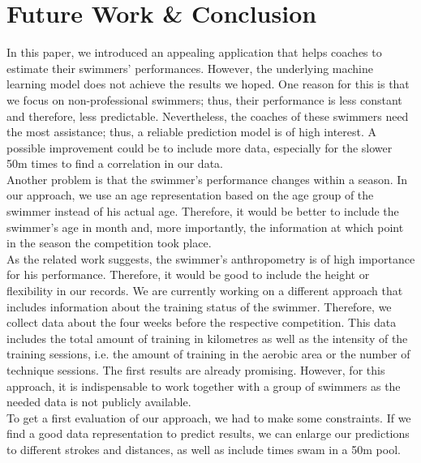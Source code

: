 \section{Future Work \& Conclusion}

In this paper, we introduced an appealing application that helps coaches to estimate their swimmers' performances. However, the underlying machine learning model does not achieve the results we hoped. One reason for this is that we focus on non-professional swimmers; thus, their performance is less constant and therefore, less predictable. Nevertheless, the coaches of these swimmers need the most assistance; thus, a reliable prediction model is of high interest. A possible improvement could be to include more data, especially for the slower 50m times to find a correlation in our data.\\
Another problem is that the swimmer's performance changes within a season. In our approach, we use an age representation based on the age group of the swimmer instead of his actual age. Therefore, it would be better to include the swimmer's age in month and, more importantly, the information at which point in the season the competition took place.\\
As the related work suggests, the swimmer's anthropometry is of high importance for his performance. Therefore, it would be good to include the height or flexibility in our records. We are currently working on a different approach that includes information about the training status of the swimmer. Therefore, we collect data about the four weeks before the respective competition. This data includes the total amount of training in kilometres as well as the intensity of the training sessions, i.e. the amount of training in the aerobic area or the number of technique sessions. The first results are already promising. However, for this approach, it is indispensable to work together with a group of swimmers as the needed data is not publicly available. \\
To get a first evaluation of our approach, we had to make some constraints. If we find a good data representation to predict results, we can enlarge our predictions to different strokes and distances, as well as include times swam in a 50m pool.